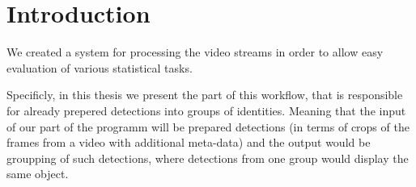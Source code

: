 \chapter*{Introduction}


We created a system for processing the video streams in order to
allow easy evaluation of various statistical tasks.

Specificly, in this thesis we present the part of this workflow, that is responsible
for already prepered detections into groups of identities. Meaning that the input of our
part of the programm will be prepared detections (in terms of crops of the frames from
a video with additional meta-data) and the output would be groupping of such detections,
where detections from one group would display the same object.